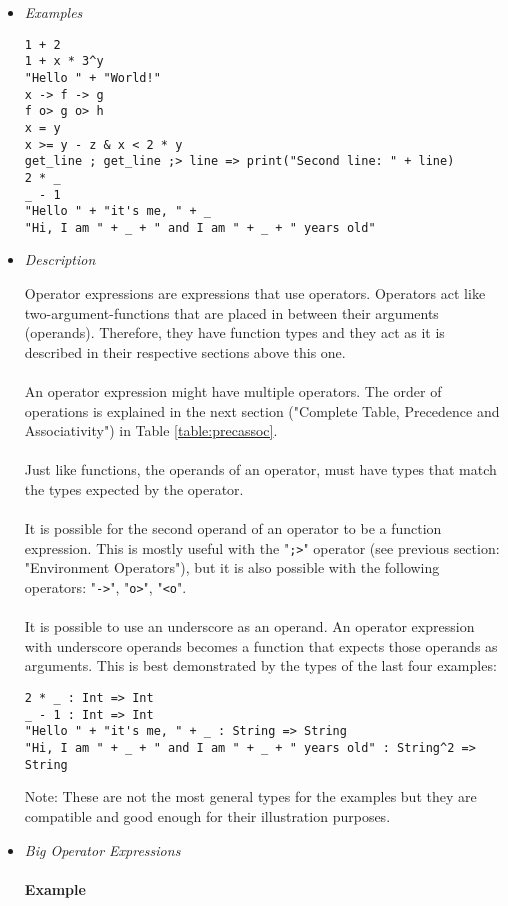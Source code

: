 \documentclass{article}
\begin{document}
\begin{itemize}
\item \textit{Examples}
\begin{verbatim}
1 + 2
1 + x * 3^y
"Hello " + "World!"
x -> f -> g
f o> g o> h
x = y
x >= y - z & x < 2 * y
get_line ; get_line ;> line => print("Second line: " + line)
2 * _
_ - 1
"Hello " + "it's me, " + _ 
"Hi, I am " + _ + " and I am " + _ + " years old"
\end{verbatim}

\item \textit{Description}

Operator expressions are expressions that use operators. Operators act like
two-argument-functions that are placed in between their arguments (operands).
Therefore, they have function types and they act as it is described in their
respective sections above this one.
\\\\
An operator expression might have multiple operators. The order of operations
is explained in the next section ("Complete Table, Precedence and
Associativity") in Table \ref{table:precassoc}.
\\\\
Just like functions, the operands of an operator, must have types that match
the types expected by the operator.
\\\\
It is possible for the second operand of an operator to be a function
expression.  This is mostly useful with the "\texttt{;>}" operator (see
previous section: "Environment Operators"), but it is also possible with the
following operators: "\texttt{->}", "\texttt{o>}", "\texttt{<o}".
\\\\
It is possible to use an underscore as an operand. An operator expression with
underscore operands becomes a function that expects those operands as
arguments.  This is best demonstrated by the types of the last four examples: 

\begin{verbatim}
2 * _ : Int => Int
_ - 1 : Int => Int
"Hello " + "it's me, " + _ : String => String
"Hi, I am " + _ + " and I am " + _ + " years old" : String^2 => String
\end{verbatim}
Note: These are not the most general types for the examples but they are
compatible and good enough for their illustration purposes.

\newpage

\item \textit{Big Operator Expressions}\\\\
\textbf{Example}


\end{itemize}
\end{document}

